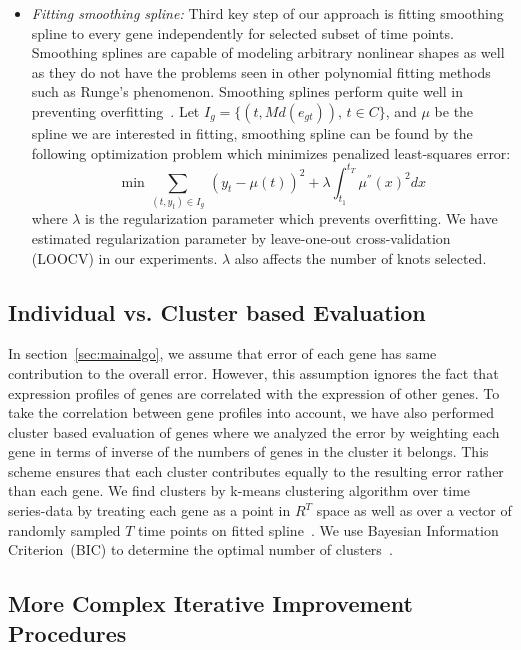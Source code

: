 \documentclass[10pt]{article}
\begin{document}
\begin{itemize}
\item {\em Fitting smoothing spline:} Third key step of our approach
  is fitting smoothing spline to every gene independently for selected
  subset of time points. Smoothing splines are capable of modeling
  arbitrary nonlinear shapes as well as they do not have the problems seen in other polynomial fitting
  methods such as Runge's phenomenon. Smoothing splines perform quite well in preventing overfitting~\cite{wahba1990}. Let
  $I_{g} = \{(t, Md(e_{gt})),\, t \in C \}$, and $\mu$ be the spline we are interested in fitting, smoothing spline
  can be found by the following optimization problem which minimizes
  penalized least-squares error:
%
\begin{equation}
\min \sum_{(t, y_{t}) \in I_{g}} \,(y_{t} - \mu(t))^{2} + \lambda
\int_{t_{1}}^{t_{T}} \mu^{''}(x)^{2} dx
\end{equation}
%
where $\lambda$ is the regularization parameter which prevents
overfitting. We have estimated regularization parameter by
leave-one-out cross-validation (LOOCV) in our experiments. $\lambda$ also affects the number of knots selected. 

\end{itemize}


\subsection{Individual vs. Cluster based Evaluation}\label{sec:clusteval}

In section~\ref{sec:mainalgo}, we assume that error of each gene has
same contribution to the overall error. However, this assumption
ignores the fact that expression profiles of genes are correlated with the expression of other genes. To take the
correlation between gene profiles into account, we have also performed cluster
based evaluation of genes where we analyzed the error by weighting each gene in terms of inverse of the numbers of
genes in the cluster it belongs. This scheme ensures that each cluster
contributes equally to the resulting error rather than each gene. We find clusters by k-means
clustering algorithm over time series-data by treating each gene as a
point in $R^{T}$ space as well as over a vector of
randomly sampled $T$ time points on fitted spline~\cite{bishop2006}. We use Bayesian Information Criterion~(BIC) to
determine the optimal number of clusters~\cite{bic}.

\subsection{More Complex Iterative Improvement Procedures}\label{sec:complexiter}
\end{document}
